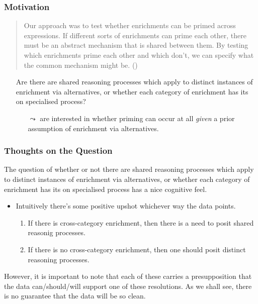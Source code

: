 \documentclass[noamssymb]{beamer}
\newcommand{\hand}{\ding{43}}
\begin{document}
\begin{frame}
  \maketitle
\end{frame}


\begin{frame}
  \frametitle{{\ftf Motivation}}

  \begin{quote}
    Our approach was to test whether enrichments can be primed across expressions.
    If different sorts of enrichments can prime each other, there must be an abstract mechanism that is shared between them.
    By testing which enrichments prime each other and which don’t, we can specify what the common mechanism might be.\nolinebreak
    \hfill(\citeyear[118]{Bott:2016aa})
\end{quote}

\begin{itemize}
\item[\hand] Are there are shared reasoning processes which apply to distinct instances of enrichment via alternatives, or whether each category of enrichment has its on specialised process?
  \begin{itemize}
  \item[\(\leadsto\)] \citeauthor{Bott:2016aa} are interested in whether priming can occur at all \emph{given} a prior assumption of enrichment via alternatives.
  \end{itemize}
\end{itemize}
\end{frame}

\begin{frame}
  \frametitle{{\ftf Thoughts on the Question}}
 The question of whether or not there are shared reasoning processes which apply to distinct instances of enrichment via alternatives, or whether each category of enrichment has its on specialised process has a nice cognitive feel.

 \begin{itemize}
  \item Intuitively there's some positive upshot whichever way the data points.
    \begin{enumerate}[label=(\roman*)]
    \item If there is cross-category enrichment, then there is a need to posit shared reasonig processes.
    \item If there is no cross-category enrichment, then one should posit distinct reasoning processes.
    \end{enumerate}
    \end{itemize}
  However, it is important to note that each of these carries a presupposition that the data can/should/will support one of these resolutions.
  As we shall see, there is no guarantee that the data will be so clean.

\end{frame}
\end{document}
